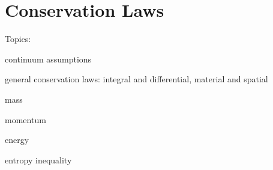 \chapter{Conservation Laws}
\label{chapter:Conservation-Laws}


Topics:

continuum assumptions

general conservation laws: integral and differential, material and spatial

mass

momentum

energy

entropy inequality